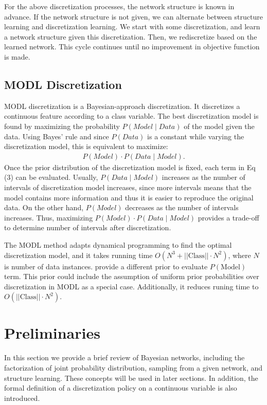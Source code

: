For the above discretization processes, the network structure is known in advance. If the network structure is not given, we can alternate between structure learning and discretization learning. We start with some discretization, and learn a network structure given this discretization. Then, we rediscretize based on the learned network. This cycle continues until no improvement in objective function is made.
\subsection{MODL Discretization}
\label{MODL}
MODL discretization \citep{Boulle_2006} is a Bayesian-approach discretization. It discretizes a continuous feature according to a class variable. The best discretization model is found by maximizing the probability $P(\textit{Model} \mid \textit{Data})$ of the model given the data. Using Bayes' rule and since $P(\textit{Data})$ is a constant while varying the discretization model, this is equivalent to maximize:
\begin{align}
P(\textit{Model}) \cdot P(\textit{Data} \mid \textit{Model}).
\end{align}
Once the prior distribution of the discretization model is fixed, each term in Eq (3) can be evaluated. Usually, $P(\textit{Data} \mid \textit{Model})$ increases as the number of intervals of discretization model increases, since more intervals means that the model contains more information and thus it is easier to reproduce the original data. On the other hand, $P(\textit{Model})$ decreases as the number of intervals increases. Thus, maximizing $P(\textit{Model}) \cdot P(\textit{Data} \mid \textit{Model})$ provides a trade-off to determine number of intervals after discretization. 

The MODL method adapts dynamical programming to find the optimal discretization model, and it takes running time $O(N^3 + ||\text{Class}|| \cdot N^2)$, where $N$ is number of data instances. \cite{Lustgarten_2011} provide a different prior to evaluate $P(\text{Model})$ term. This prior could include the assumption of uniform prior probabilities over discretization in MODL as a special case. Additionally, it reduces runing time to $O(||\text{Class}|| \cdot N^2)$.


\section{Preliminaries}
\label{Prelim_Notation}
In this section we provide a brief review of Bayesian networks, including the factorization of joint probability distribution, sampling from a given network, and structure learning. These concepts will be used in later sections. In addition, the formal definition of a discretization policy on a continuous variable is also introduced.


